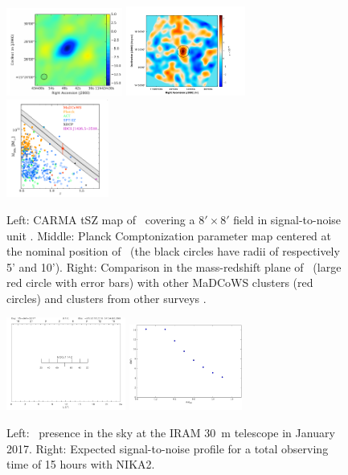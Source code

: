 \documentclass[11pt,a4paper,twoside,graphicx,color]{article}
\begin{document}
\begin{figure}[h]
\centering	
\includegraphics[width=0.34\textwidth]{./cluster.pdf}   
\hspace{0.13cm}
\includegraphics[width=0.35\textwidth]{.//MOO_Planck_3.pdf}
\hspace{-0.5cm}  
 \includegraphics[width=0.3\textwidth]{./redshift_mass.pdf}   
\caption{\footnotesize Left: CARMA tSZ map of \moo\ covering a $8' \times 8'$ field in signal-to-noise unit \cite{gon15}. Middle: Planck Comptonization parameter map centered at the nominal position of \moo\  (the black circles have radii of respectively 5' and 10'). Right: Comparison in the mass-redshift plane of \moo\ (large red circle with error bars) with other MaDCoWS clusters (red circles) and clusters from other surveys \cite{gon15}.}
\label{fig:SZ_MOO}
\end{figure}

\begin{figure}[h!]
\centering	
\includegraphics[width=0.35\textwidth]{./sky_trajectory.png}
\hspace{1.5cm}
\includegraphics[width=0.33\textwidth]{./MOOJ1142_snr_prof.pdf}  
\caption{\footnotesize Left: \moo\ presence in the sky at the IRAM 30~m telescope in January 2017. Right: Expected signal-to-noise profile for a total observing time of 15 hours with NIKA2.}
\label{fig:technical}
\end{figure}
\end{document}
